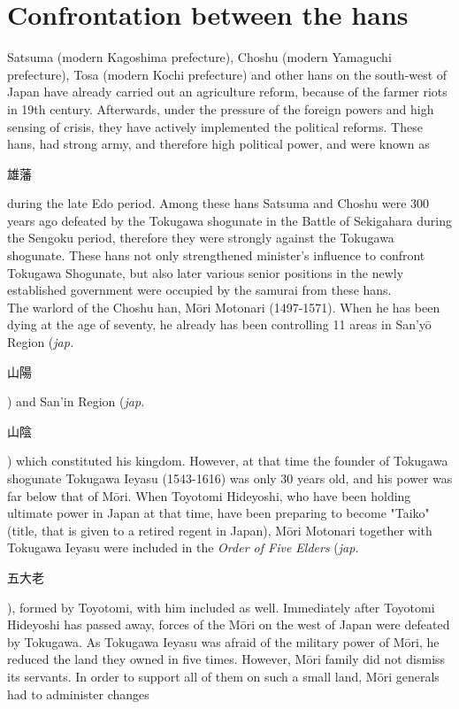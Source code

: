 \documentclass[11pt]{book}
\begin{document}
\section{Confrontation between the hans}
Satsuma (modern Kagoshima prefecture), Choshu (modern Yamaguchi prefecture), Tosa (modern Kochi prefecture) and other hans on the south-west 
of Japan have already carried out an agriculture reform, because of the farmer riots in 19th century. Afterwards, under the pressure of the
foreign powers and high sensing of crisis, they have actively implemented the political reforms. These hans, had strong army, and therefore
high political power, and were known as \begin{CJK}{UTF8}{bsmi}雄藩\end{CJK} during the late Edo period. Among these hans Satsuma
and Choshu were 300 years ago defeated by the Tokugawa shogunate in the Battle of Sekigahara during the Sengoku period, therefore they were
strongly against the Tokugawa shogunate. These hans not only strengthened minister's influence to confront Tokugawa Shogunate, but also later
various senior positions in the newly established government were occupied by the samurai from these hans.\\
The warlord of the Choshu han, M\=ori Motonari (1497-1571). When he has been dying at the age of seventy, he already has been controlling 11 areas
in San'y\=o Region (\textit{jap.} \begin{CJK}{UTF8}{bsmi}山陽\end{CJK}) and
	San'in Region (\textit{jap.} \begin{CJK}{UTF8}{bsmi}山陰\end{CJK}) which constituted his kingdom.
However, at that time the founder of Tokugawa shogunate Tokugawa Ieyasu (1543-1616) was only 30 years old, and his power was far below
that of M\=ori. When Toyotomi Hideyoshi, who have been holding ultimate power in Japan at that time, have been preparing to become "Taiko" (title,
that is given to a retired regent in Japan), M\=ori Motonari together with Tokugawa Ieyasu were included in the \textit{Order of Five Elders}
(\textit{jap.} \begin{CJK}{UTF8}{bsmi}五大老\end{CJK}), 
formed by Toyotomi, with him included as well. Immediately after Toyotomi Hideyoshi has passed away, forces of the M\=ori on the west of Japan
were defeated by Tokugawa. As Tokugawa Ieyasu was afraid of the military power of M\=ori, he reduced the land they owned in five times. However,
M\=ori family did not dismiss its servants. In order to support all of them on such a small land, M\=ori generals had to administer changes
\end{document}
